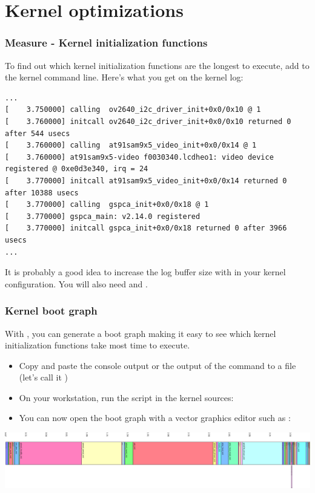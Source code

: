 \section{Kernel optimizations}

\begin{frame}[fragile]
\frametitle{Measure - Kernel initialization functions}
To find out which kernel initialization functions are the longest to
execute, add  to the kernel command line.
Here's what you get on the kernel log:
\begin{block}{}
\tiny
\begin{verbatim}
...
[    3.750000] calling  ov2640_i2c_driver_init+0x0/0x10 @ 1
[    3.760000] initcall ov2640_i2c_driver_init+0x0/0x10 returned 0 after 544 usecs
[    3.760000] calling  at91sam9x5_video_init+0x0/0x14 @ 1
[    3.760000] at91sam9x5-video f0030340.lcdheo1: video device registered @ 0xe0d3e340, irq = 24
[    3.770000] initcall at91sam9x5_video_init+0x0/0x14 returned 0 after 10388 usecs
[    3.770000] calling  gspca_init+0x0/0x18 @ 1
[    3.770000] gspca_main: v2.14.0 registered
[    3.770000] initcall gspca_init+0x0/0x18 returned 0 after 3966 usecs
...
\end{verbatim}
\end{block}
It is probably a good idea to increase the log buffer size with
 in your kernel configuration. You will
also need  and .
\end{frame}

\begin{frame}
\frametitle{Kernel boot graph}
With , you can generate a boot graph
making it easy to see which kernel initialization functions
take most time to execute.
\begin{itemize}
\item Copy and paste the console output or the output of
      the  command to a file (let's call it )
\item On your workstation, run the  script
      in the kernel sources: \\
\item You can now open the boot graph with a vector graphics 
      editor such as :
\end{itemize}
\begin{center}
    \includegraphics[width=\textwidth]{slides/boottime-kernel/boot.png}
\end{center}
\end{frame}

